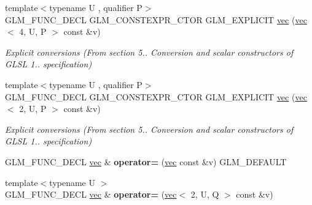 \begin{DoxyCompactItemize}
{\footnotesize template$<$typename U , qualifier P$>$ }\\G\+L\+M\+\_\+\+F\+U\+N\+C\+\_\+\+D\+E\+CL G\+L\+M\+\_\+\+C\+O\+N\+S\+T\+E\+X\+P\+R\+\_\+\+C\+T\+OR G\+L\+M\+\_\+\+E\+X\+P\+L\+I\+C\+IT \hyperlink{structglm_1_1vec_3_012_00_01T_00_01Q_01_4_a2f77cbeba0c2efa024d10e348636c7c1}{vec} (\hyperlink{structglm_1_1vec}{vec}$<$ 4, U, P $>$ const \&v)
\begin{DoxyCompactList}\small\item\em Explicit conversions (From section 5.. Conversion and scalar constructors of G\+L\+SL 1.. specification) \end{DoxyCompactList}\item 
\mbox{\label{structglm_1_1vec_3_012_00_01T_00_01Q_01_4_a55d77d8b7320875815bfe34fd59823af}} 
{\footnotesize template$<$typename U , qualifier P$>$ }\\G\+L\+M\+\_\+\+F\+U\+N\+C\+\_\+\+D\+E\+CL G\+L\+M\+\_\+\+C\+O\+N\+S\+T\+E\+X\+P\+R\+\_\+\+C\+T\+OR G\+L\+M\+\_\+\+E\+X\+P\+L\+I\+C\+IT \hyperlink{structglm_1_1vec_3_012_00_01T_00_01Q_01_4_a55d77d8b7320875815bfe34fd59823af}{vec} (\hyperlink{structglm_1_1vec}{vec}$<$ 2, U, P $>$ const \&v)
\begin{DoxyCompactList}\small\item\em Explicit conversions (From section 5.. Conversion and scalar constructors of G\+L\+SL 1.. specification) \end{DoxyCompactList}\item 
\mbox{\label{structglm_1_1vec_3_012_00_01T_00_01Q_01_4_a9433374bb987717a86fc033cca52a48a}} 
G\+L\+M\+\_\+\+F\+U\+N\+C\+\_\+\+D\+E\+CL \hyperlink{structglm_1_1vec}{vec} \& {\bfseries operator=} (\hyperlink{structglm_1_1vec}{vec} const \&v) G\+L\+M\+\_\+\+D\+E\+F\+A\+U\+LT
\item 
\mbox{\label{structglm_1_1vec_3_012_00_01T_00_01Q_01_4_af8cd16f5edd80288ab154ef7616a79de}} 
{\footnotesize template$<$typename U $>$ }\\G\+L\+M\+\_\+\+F\+U\+N\+C\+\_\+\+D\+E\+CL \hyperlink{structglm_1_1vec}{vec} \& {\bfseries operator=} (\hyperlink{structglm_1_1vec}{vec}$<$ 2, U, Q $>$ const \&v)
\item 
\mbox{\label{structglm_1_1vec_3_012_00_01T_00_01Q_01_4_a7c1fa9f2692a42abc2cef20f639f7adf}} 

\end{DoxyCompactItemize}
